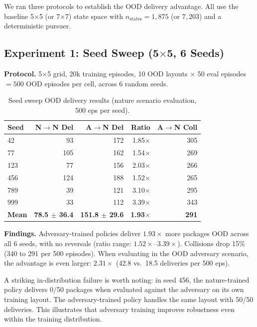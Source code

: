 \documentclass[sigconf]{aamas}
\begin{document}
We ran three protocols to establish the OOD delivery advantage. All use the baseline 5$\times$5 (or 7$\times$7) state space with
$n_\text{states} = 1{,}875$ (or $7{,}203$) and a deterministic pursuer.

\subsection{Experiment 1: Seed Sweep (5$\times$5, 6 Seeds)}

\textbf{Protocol.} 5$\times$5 grid, 20k training episodes, 10 OOD layouts
$\times$ 50 eval episodes $= 500$ OOD episodes per cell, across 6 random seeds.

\begin{table}[H]
\caption{Seed sweep OOD delivery results (nature scenario evaluation, 500 eps per seed).}
\label{tab:seed-sweep}
\centering
\footnotesize
\begin{tabular}{lrrrr}
\toprule
\textbf{Seed} & \textbf{N$\to$N Del} & \textbf{A$\to$N Del} & \textbf{Ratio} & \textbf{A$\to$N Coll} \\
\midrule
42  & 93  & 172 & 1.85$\times$ & 305 \\
77  & 105 & 162 & 1.54$\times$ & 269 \\
123 & 77  & 156 & 2.03$\times$ & 266 \\
456 & 124 & 188 & 1.52$\times$ & 265 \\
789 & 39  & 121 & 3.10$\times$ & 295 \\
999 & 33  & 112 & 3.39$\times$ & 343 \\
\midrule
\textbf{Mean} & \textbf{78.5 $\pm$ 36.4} & \textbf{151.8 $\pm$ 29.6} & \textbf{1.93$\times$} & \textbf{291} \\
\bottomrule
\end{tabular}
\end{table}

\textbf{Findings.} Adversary-trained policies deliver $1.93\times$ more
packages OOD across all 6 seeds, with no reversals (ratio range: $1.52\times$--$3.39\times$).
Collisions drop 15\% (340 to 291 per 500 episodes). When evaluating in the OOD adversary scenario,
the advantage is even larger: $2.31\times$ (42.8 vs.\ 18.5 deliveries per 500 eps).

A striking in-distribution failure is worth noting: in seed 456, the nature-trained
policy delivers 0/50 packages when evaluated against the adversary on its own
training layout. The adversary-trained policy handles the same layout with 50/50
deliveries. This illustrates that adversary training improves robustness even within
the training distribution.
\end{document}
